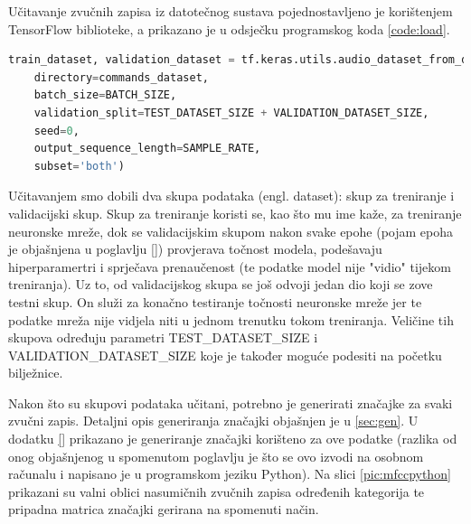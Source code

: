 Učitavanje zvučnih zapisa iz datotečnog sustava pojednostavljeno je korištenjem
TensorFlow biblioteke, a prikazano je u odsječku programskog koda \ref{code:load}.

\begin{lstlisting}[language=Python, caption=Učitavanje zvučnih zapisa, label=code:load]
train_dataset, validation_dataset = tf.keras.utils.audio_dataset_from_directory(
    directory=commands_dataset,
    batch_size=BATCH_SIZE,
    validation_split=TEST_DATASET_SIZE + VALIDATION_DATASET_SIZE,
    seed=0,
    output_sequence_length=SAMPLE_RATE,
    subset='both')
\end{lstlisting}

Učitavanjem smo dobili dva skupa podataka (engl. dataset): skup za treniranje i validacijski skup.
Skup za treniranje koristi se, kao što mu ime kaže, za treniranje neuronske mreže,
dok se validacijskim skupom nakon svake epohe (pojam epoha je objašnjena u poglavlju \ref{}) 
provjerava točnost modela, podešavaju
hiperparamertri i sprječava prenaučenost (te podatke model nije "vidio" tijekom treniranja).
Uz to, od validacijskog skupa se još odvoji jedan dio koji se zove testni skup. On služi
za konačno testiranje točnosti neuronske mreže jer te podatke mreža nije vidjela niti
u jednom trenutku tokom treniranja. Veličine tih skupova određuju parametri 
TEST\_DATASET\_SIZE i VALIDATION\_DATASET\_SIZE koje je također moguće podesiti na početku
bilježnice. 

Nakon što su skupovi podataka učitani, potrebno je generirati značajke za svaki zvučni zapis.
Detaljni opis generiranja značajki objašnjen je u \ref{sec:gen}. U dodatku \ref{} prikazano
je generiranje značajki korišteno za ove podatke (razlika od onog objašnjenog u spomenutom poglavlju
je što se ovo izvodi na osobnom računalu i napisano je u programskom jeziku Python).
Na slici \ref{pic:mfccpython} prikazani su valni oblici nasumičnih zvučnih zapisa određenih 
kategorija te pripadna matrica značajki gerirana na spomenuti način.

